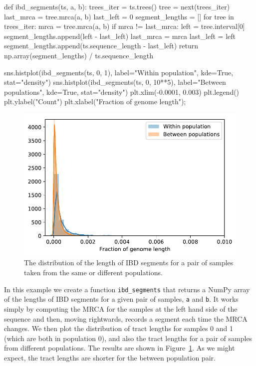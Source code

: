 \documentclass[graybox]{svmult}
\begin{document}
\begin{pythoncode}
def ibd_segments(ts, a, b):
    trees_iter = ts.trees()
    tree = next(trees_iter)
    last_mrca = tree.mrca(a, b)
    last_left = 0
    segment_lengths = []
    for tree in trees_iter:
        mrca = tree.mrca(a, b)
        if mrca != last_mrca:
            left = tree.interval[0]
            segment_lengths.append(left - last_left)
            last_mrca = mrca
            last_left = left
    segment_lengths.append(ts.sequence_length - last_left)
    return np.array(segment_lengths) / ts.sequence_length

sns.histplot(ibd_segments(ts, 0, 1), label="Within population", kde=True,
    stat="density")
sns.histplot(ibd_segments(ts, 0, 10**5), label="Between populations", kde=True,
    stat="density")
plt.xlim(-0.0001, 0.003)
plt.legend()
plt.ylabel("Count")
plt.xlabel("Fraction of genome length");
\end{pythoncode}

\begin{figure}
\begin{center}
\includegraphics[width=\textwidth]{images/plot_12.pdf}
\end{center}
\caption{\label{fig:ibd_segments} The distribution of the length of IBD
segments for a pair of samples taken from the same or different populations.}
\end{figure}

In this example we create a function \texttt{ibd\_segments} that returns
a NumPy array of the lengths of IBD segments for a given pair of
samples, \texttt{a} and \texttt{b}. It works simply by computing the
MRCA for the samples at the left hand side of the sequence and then,
moving rightwards, records a segment each time the MRCA changes. We then
plot the distribution of tract lengths for samples 0 and 1 (which are
both in population 0), and also the tract lengths for a pair of
samples from different populations. The results are shown in
Figure~\ref{fig:ibd_segments}. As we might expect, the tract
lengths are shorter for the between population pair.
\end{document}
